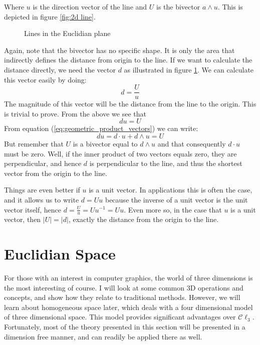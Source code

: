 \documentclass[10pt]{report}
\begin{document}
Where $u$ is the direction vector of the line and $U$ is the
bivector $a\wedge u$. This is depicted in figure \ref{fig:2d
line}.

\begin{figure}[ht]
\centering

\caption{Lines in the Euclidian plane} \label{fig:2d line}
\end{figure}

Again, note that the bivector has no specific shape. It is only
the area that indirectly defines the distance from origin to the
line. If we want to calculate the distance directly, we need the
vector $d$ as illustrated in figure \ref{fig:2d line}. We can
calculate this vector easily by doing:
\begin{displaymath}
    d = \frac{U}{u}
\end{displaymath}
The magnitude of this vector will be the distance from the line to
the origin. This is trivial to prove. From the above we see that
\begin{displaymath}
    du = U
\end{displaymath}
From equation (\ref{eq:geometric_product_vectors}) we can write:
\begin{displaymath}
    du = d\cdot u + d\wedge u = U
\end{displaymath}
But remember that $U$ is a bivector equal to $d\wedge u$ and that
consequently $d\cdot u$ must be zero. Well, if the inner product
of two vectors equals zero, they are perpendicular, and hence $d$
is perpendicular to the line, and thus the shortest vector from
the origin to the line.

Things are even better if $u$ is a unit vector. In applications
this is often the case, and it allows us to write $d = Uu$ because
the inverse of a unit vector is the unit vector itself, hence $d =
\frac{U}{u} = Uu^{-1} = Uu$. Even more so, in the case that $u$ is
a unit vector, then $|U| = |d|$, exactly the distance from the
origin to the line.

\newpage
\section{Euclidian Space}

For those with an interest in computer graphics, the world of
three dimensions is the most interesting of course. I will look at
some common 3D operations and concepts, and show how they relate
to traditional methods. However, we will learn about homogeneous
space later, which deals with a four dimensional model of three
dimensional space. This model provides significant advantages over
$\mathcal{C}\ell_3$. Fortunately, most of the theory presented in
this section will be presented in a dimension free manner, and can
readily be applied there as well.
\end{document}
